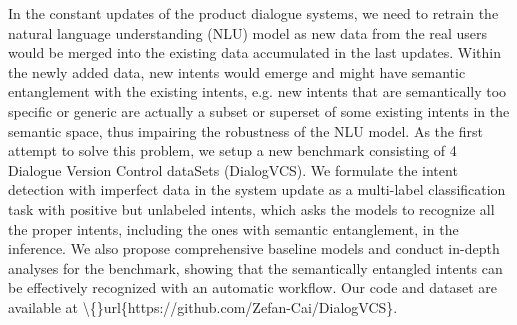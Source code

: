In the constant updates of the product dialogue systems, we need to retrain the natural language understanding (NLU) model as new data from the real users would be merged into the existing data accumulated in the last updates.  Within the newly added data, new intents would emerge and might have semantic entanglement with the existing intents, e.g. new intents that are semantically too specific or generic are actually a subset or superset of some existing intents in the semantic space, thus impairing the robustness of the NLU model. As the first attempt to solve this problem, we setup a new benchmark consisting of 4 Dialogue Version Control dataSets (DialogVCS). We formulate the intent detection with imperfect data in the system update as a multi-label classification task with positive but unlabeled intents, which asks the models to recognize all the proper intents, including the ones with semantic entanglement, in the inference. We also propose comprehensive baseline models and conduct in-depth analyses for the benchmark, showing that the semantically entangled intents can be effectively recognized with an automatic workflow. Our code and dataset are available at \textbackslash\{\}url\{https://github.com/Zefan-Cai/DialogVCS\}.